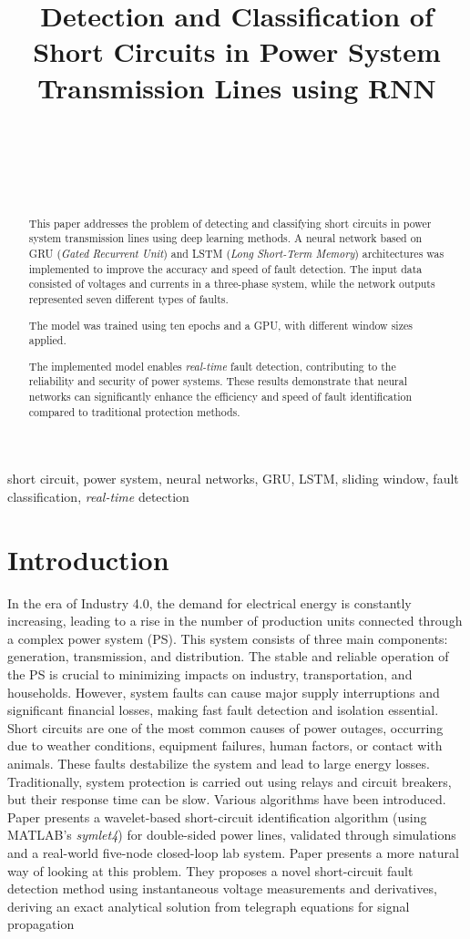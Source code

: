 \documentclass[11pt]{IEEEtran}
\title{Detection and Classification of Short Circuits in Power System Transmission Lines using RNN\\
}
\author{\IEEEauthorblockN{Harun Špago} \\
\IEEEauthorblockA{\textit{University of Sarajevo}} \\
\IEEEauthorblockA{\textit{Faculty of Electrical Engineering Sarajevo}} \\
\IEEEauthorblockA{\textit{Department of Automation and Electronics} \\
\textit{B\&H, Sarajevo}\\
Emails: hspago1@etf.unsa.ba}\\
}
\begin{document}
\maketitle

\begin{abstract}
This paper addresses the problem of detecting and classifying short circuits in power system transmission lines using deep learning methods. A neural network based on GRU (\textit{Gated Recurrent Unit}) and LSTM (\textit{Long Short-Term Memory}) architectures was implemented to improve the accuracy and speed of fault detection. The input data consisted of voltages and currents in a three-phase system, while the network outputs represented seven different types of faults.

The model was trained using ten epochs and a GPU, with different window sizes applied. 

The implemented model enables \textit{real-time} fault detection, contributing to the reliability and security of power systems. These results demonstrate that neural networks can significantly enhance the efficiency and speed of fault identification compared to traditional protection methods.
\end{abstract}

\begin{IEEEkeywords}
short circuit, power system, neural networks, GRU, LSTM, sliding window, fault classification, \textit{real-time} detection
\end{IEEEkeywords}

\section{Introduction}
In the era of Industry 4.0, the demand for electrical energy is constantly increasing, leading to a rise in the number of production units connected through a complex power system (PS). This system consists of three main components: generation, transmission, and distribution. The stable and reliable operation of the PS is crucial to minimizing impacts on industry, transportation, and households. 
However, system faults can cause major supply interruptions and significant financial losses, making fast fault detection and isolation essential.\\
Short circuits are one of the most common causes of power outages, occurring due to weather conditions, equipment failures, human factors, or contact with animals. These faults destabilize the system and lead to large energy losses. Traditionally, system protection is carried out using relays and circuit breakers, but their response time can be slow.
Various algorithms have been introduced. Paper \cite{8442440} presents a wavelet-based short-circuit identification algorithm (using MATLAB’s \textit{symlet4}) for double-sided power lines, validated through simulations and a real-world five-node closed-loop lab system.
Paper \cite{7806061} presents a more natural way of looking at this problem. They proposes a novel short-circuit fault detection method using instantaneous voltage measurements and derivatives, deriving an exact analytical solution from telegraph equations for signal propagation
\end{document}

